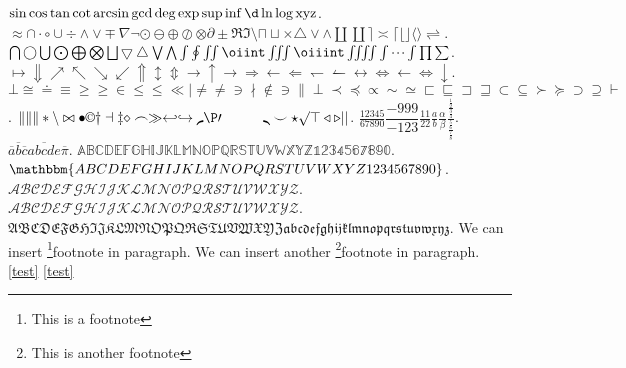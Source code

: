 \documentclass{ctexart}
\begin{document}
\(\sin \cos \tan \cot \arcsin \gcd \deg \exp \sup \inf \d \ln \log
\operatorname{xyz}\).
\(\approx \cap \cdot \circ \cup \div \land \lor \mp \nabla \neg \odot
  \ominus \oplus \oslash \otimes \partial \pm \Re \Im \setminus \sqcap
  \sqcup \times \triangle \vee \wedge \amalg \coprod \rceil \asymp
\lceil \lfloor \rfloor \langle \rangle \rightleftharpoons \).
\(\bigcap \bigcirc \bigcup \bigodot \bigoplus \bigotimes \bigsqcup
  \bigtriangledown \bigtriangleup \bigvee \bigwedge \int \oint \iint
\oiint \iiint \oiiint \iiiint \idotsint \prod \sum \).
\(\mapsto \Downarrow \nearrow \nwarrow \searrow \swarrow \Uparrow
  \updownarrow \Updownarrow \to \uparrow \rightarrow \Rightarrow
  \leftarrow \Leftarrow \leftharpoondown \leftharpoonup \leftrightarrow
\Leftrightarrow \gets \iff \downarrow \).
\(\bot \cong \doteq \equiv \ge \geq \in \le \leq \ll \mid \ne \neq
  \ni \nmid \notin \owns \parallel \perp \prec \preceq \propto \sim
  \simeq \sqsubset \sqsubseteq \sqsupset \sqsupseteq \subset \subseteq
\succ \succeq \supset \supseteq \vdash \).
\(\| \lVert \rVert \ast \backslash \bowtie \bullet \copyright \dagger
  \dashv \ddagger \diamond \frown \gg \hookleftarrow \hookrightarrow
  \lmoustache \P \prime \quad \qquad \rmoustache \smile \star \surd
\top \triangleleft \triangleright \lvert \rvert \).
\(\frac{12345}{67890} \dfrac{-999}{-123} \tfrac{11}{22} \frac{a}{b}
  \frac{\alpha}{\beta}
\frac{\frac{\frac{1}{2}}{\frac{3}{4}}}{\frac{\frac{5}{6}}{\frac{7}{8}}}\).
\(\overline{a} \overline{b} \overline{c} \overline{abcde}  \overline{\pi} \).
\(\mathbb{ABCDEFGHIJKLMNOPQRSTUVWXYZ1234567890} \).
\(\mathbbm{ABCDEFGHIJKLMNOPQRSTUVWXYZ1234567890} \).
\(\mathcal{ABCDEFGHIJKLMNOPQRSTUVWXYZ}\).
\(\mathscr{ABCDEFGHIJKLMNOPQRSTUVWXYZ}\).
\(\mathfrak{ABCDEFGHIJKLMNOPQRSTUVWXYZabcdefghijklmnopqrstuvwxyz}\).
We can insert \footnote{This is a footnote}{footnote} in paragraph.
We can insert another \footnote{This is another footnote}{footnote}
in paragraph.
\label{test}
\ref{test}
\eqref{test}
\end{document}
